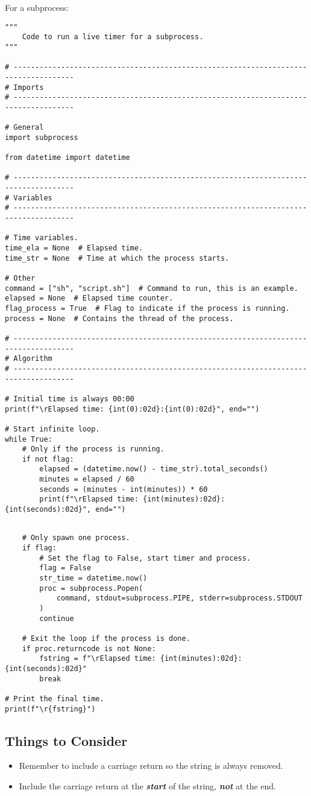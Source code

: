 For a subprocess:
\begin{verbatim}
"""
    Code to run a live timer for a subprocess.
"""

# ------------------------------------------------------------------------------------
# Imports
# ------------------------------------------------------------------------------------

# General
import subprocess

from datetime import datetime

# ------------------------------------------------------------------------------------
# Variables
# ------------------------------------------------------------------------------------

# Time variables.
time_ela = None  # Elapsed time.
time_str = None  # Time at which the process starts.

# Other
command = ["sh", "script.sh"]  # Command to run, this is an example.
elapsed = None  # Elapsed time counter.
flag_process = True  # Flag to indicate if the process is running.
process = None  # Contains the thread of the process.

# ------------------------------------------------------------------------------------
# Algorithm
# ------------------------------------------------------------------------------------

# Initial time is always 00:00
print(f"\rElapsed time: {int(0):02d}:{int(0):02d}", end="")

# Start infinite loop.
while True:
    # Only if the process is running.
    if not flag:
        elapsed = (datetime.now() - time_str).total_seconds()
        minutes = elapsed / 60
        seconds = (minutes - int(minutes)) * 60
        print(f"\rElapsed time: {int(minutes):02d}:{int(seconds):02d}", end="")

\end{verbatim}
\newpage
\begin{verbatim}

    # Only spawn one process.
    if flag:
        # Set the flag to False, start timer and process.
        flag = False
        str_time = datetime.now()
        proc = subprocess.Popen(
            command, stdout=subprocess.PIPE, stderr=subprocess.STDOUT
        )
        continue
    
    # Exit the loop if the process is done.
    if proc.returncode is not None:
        fstring = f"\rElapsed time: {int(minutes):02d}:{int(seconds):02d}"
        break

# Print the final time.
print(f"\r{fstring}")

\end{verbatim}
\subsection*{Things to Consider}
\begin{itemize}
    \item Remember to include a carriage return so the string is always removed.
    \item Include the carriage return at the \textbf{\textit{start}} of the string,
          \textbf{\textit{not}} at the end.
\end{itemize}

